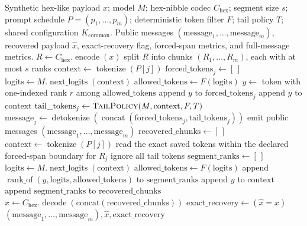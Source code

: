 \documentclass[fleqn,10pt]{wlscirep}
\newcommand{\RankOf}{\operatorname{rank\_of}}
\newcommand{\Encode}{\operatorname{encode}}
\newcommand{\Decode}{\operatorname{decode}}
\newcommand{\Tokenize}{\operatorname{tokenize}}
\newcommand{\Detokenize}{\operatorname{detokenize}}
\newcommand{\NextLogits}{\operatorname{next\_logits}}
\begin{document}
\begin{algorithm}[H]
\caption{Segmented multi-cover RankCloak trial for distributing a hex-nibble payload across payload-bearing forced spans with non-payload natural tails.}
\label{alg:segmented}
\begin{algorithmic}[1]
\Require Synthetic hex-like payload \(x\); model \(M\); hex-nibble codec \(C_{\mathrm{hex}}\); segment size \(s\); prompt schedule \(P=(p_1,\ldots,p_m)\); deterministic token filter \(F\); tail policy \(T\); shared configuration \(K_{\mathrm{common}}\).
\Ensure Public messages \((\mathrm{message}_1,\ldots,\mathrm{message}_m)\), recovered payload \(\hat{x}\), exact-recovery flag, forced-span metrics, and full-message metrics.
\State \(R \gets C_{\mathrm{hex}}.\Encode(x)\)
\State split \(R\) into chunks \((R_1,\ldots,R_m)\), each with at most \(s\) ranks
    \State \(\mathrm{context} \gets \Tokenize(P[j])\)
    \State \(\mathrm{forced\_tokens}_j \gets [\,]\)
        \State \(\mathrm{logits} \gets M.\NextLogits(\mathrm{context})\)
        \State \(\mathrm{allowed\_tokens} \gets F(\mathrm{logits})\)
        \State \(y \gets\) token with one-indexed rank \(r\) among \(\mathrm{allowed\_tokens}\)
        \State append \(y\) to \(\mathrm{forced\_tokens}_j\)
        \State append \(y\) to \(\mathrm{context}\)
    \EndFor
    \State \(\mathrm{tail\_tokens}_j \gets \Call{TailPolicy}{M,\mathrm{context},F,T}\)
    \State \(\mathrm{message}_j \gets \Detokenize(\operatorname{concat}(\mathrm{forced\_tokens}_j,\mathrm{tail\_tokens}_j))\)
\EndFor
\State emit public messages \((\mathrm{message}_1,\ldots,\mathrm{message}_m)\)
\Statex
\State \(\mathrm{recovered\_chunks} \gets [\,]\)
    \State \(\mathrm{context} \gets \Tokenize(P[j])\)
    \State read the exact saved tokens within the declared forced-span boundary for \(R_j\)
    \State ignore all tail tokens
    \State \(\mathrm{segment\_ranks} \gets [\,]\)
        \State \(\mathrm{logits} \gets M.\NextLogits(\mathrm{context})\)
        \State \(\mathrm{allowed\_tokens} \gets F(\mathrm{logits})\)
        \State append \(\RankOf(y,\mathrm{logits},\mathrm{allowed\_tokens})\) to \(\mathrm{segment\_ranks}\)
        \State append \(y\) to \(\mathrm{context}\)
    \EndFor
    \State append \(\mathrm{segment\_ranks}\) to \(\mathrm{recovered\_chunks}\)
\EndFor
\State \(\hat{x} \gets C_{\mathrm{hex}}.\Decode(\mathrm{concat}(\mathrm{recovered\_chunks}))\)
\State \(\mathrm{exact\_recovery} \gets (\hat{x}=x)\)
\State \Return \((\mathrm{message}_1,\ldots,\mathrm{message}_m),\hat{x},\mathrm{exact\_recovery}\)
\end{algorithmic}
\end{algorithm}
\end{document}
